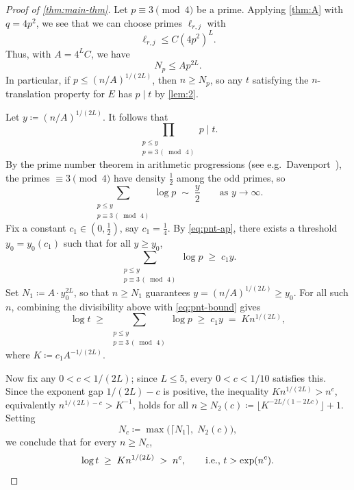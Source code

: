 \documentclass{amsart}
\begin{document}
\begin{proof}[Proof of \cref{thm:main-thm}]
    Let $p \equiv 3 \pmod 4$ be a prime.
    Applying \cref{thm:A} with $q = 4p^2$, we see that we can choose primes $\ell_{r,j}$ with
    \[ \ell_{r,j} \leq C (4p^2)^L.\]
    Thus, with $A = 4^L C$, we have
    \begin{equation*}
        N_p \leq A p^{2L}.
    \end{equation*}
    In particular, if $p \leq (n/A)^{1/(2L)}$, then $n \geq N_p$, so any $t$ satisfying the $n$-translation property for $E$ has $p \mid t$ by \cref{lem:2}.

    Let $y \coloneqq (n/A)^{1/(2L)}$. It follows that
    \[
\prod_{\substack{p\le y\\ p\equiv 3 \,(\bmod\, 4)}} p \;\Big|\; t.
\]
By the prime number theorem in arithmetic progressions (see e.g.\ Davenport~\cite{davenport2000}), the primes $\equiv 3 \pmod 4$ have density $\tfrac12$ among the odd primes, so
\begin{equation}\label{eq:pnt-ap}
    \sum_{\substack{p\le y\\ p\equiv 3 \,(\bmod\, 4)}} \log p \;\sim\;
    \frac{y}{2} \qquad \text{as } y \to \infty.
\end{equation}
Fix a constant $c_1 \in (0, \tfrac12)$, say $c_1 = \tfrac14$. By \eqref{eq:pnt-ap}, there exists a threshold $y_0 = y_0(c_1)$ such that for all $y \geq y_0$,
\begin{equation}\label{eq:pnt-bound}
    \sum_{\substack{p\le y\\ p\equiv 3 \,(\bmod\, 4)}} \log p \;\geq\; c_1 y.
\end{equation}
Set $N_1 \coloneqq A \cdot y_0^{2L}$, so that $n \geq N_1$ guarantees $y = (n/A)^{1/(2L)} \geq y_0$. For all such $n$, combining the divisibility above with \eqref{eq:pnt-bound} gives
\begin{equation*}
    \log t \;\geq\; \sum_{\substack{p\le y\\ p\equiv 3 \,(\bmod\, 4)}} \log p \;\geq\; c_1 y \;=\; K n^{1/(2L)},
\end{equation*}
where $K \coloneqq c_1 A^{-1/(2L)}$.

Now fix any $0 < c < 1/(2L)$; since $L \leq 5$, every $0 < c < 1/10$ satisfies this. Since the exponent gap $1/(2L) - c$ is positive, the inequality $K n^{1/(2L)} > n^c$, equivalently $n^{1/(2L) - c} > K^{-1}$, holds for all $n \geq N_2(c) \coloneqq \lfloor K^{-2L/(1 - 2Lc)} \rfloor + 1$. Setting
\[
N_c \coloneqq \max\bigl(\lceil N_1 \rceil,\; N_2(c)\bigr),
\]
we conclude that for every $n \geq N_c$,
\[
\log t \;\geq\; K n^{1/(2L)} \;>\; n^c, \qquad \text{i.e., } t > \exp(n^c). \qedhere
\]
\end{proof}
\end{document}
